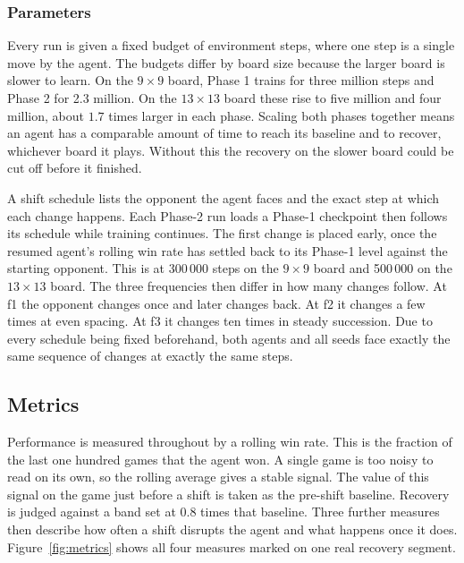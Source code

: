 \documentclass[sigconf,nonacm]{acmart}
\begin{document}
\subsubsection{Parameters}
Every run is given a fixed budget of environment steps, where one step is a single
move by the agent. The budgets differ by board size because the larger board is
slower to learn. On the $9\times9$ board, Phase 1 trains for three million steps
and Phase 2 for 2.3 million. On the $13\times13$ board these rise to five
million and four million, about $1.7$ times larger in each phase. Scaling both
phases together means an agent has a comparable amount of time to reach its
baseline and to recover, whichever board it plays. Without this the recovery on the
slower board could be cut off before it finished.

A shift schedule lists the opponent the agent faces and the exact step at which
each change happens. Each Phase-2 run loads a Phase-1 checkpoint then follows its
schedule while training continues. The first change is placed early, once the
resumed agent's rolling win rate has settled back to its Phase-1 level against the starting
opponent. This is at
300\,000 steps on the $9\times9$ board and 500\,000 on the $13\times13$ board. The
three frequencies then differ in how many changes follow. At f1 the opponent
changes once and later changes back. At f2 it changes a few times at even spacing.
At f3 it changes ten times in steady succession. Due to every schedule being fixed
beforehand, both agents and all seeds face exactly the same sequence of changes at
exactly the same steps.



\subsection{Metrics}
Performance is measured throughout by a rolling win rate. This is the fraction of
the last one hundred games that the agent won. A single game is too noisy to read
on its own, so the rolling average gives a stable signal. The value of this signal
on the game just before a shift is taken as the pre-shift baseline. Recovery is
judged against a band set at $0.8$ times that baseline. Three further measures then
describe how often a shift disrupts the agent and what happens once it does. Figure~\ref{fig:metrics} shows all four measures marked on one real recovery segment.
\end{document}
